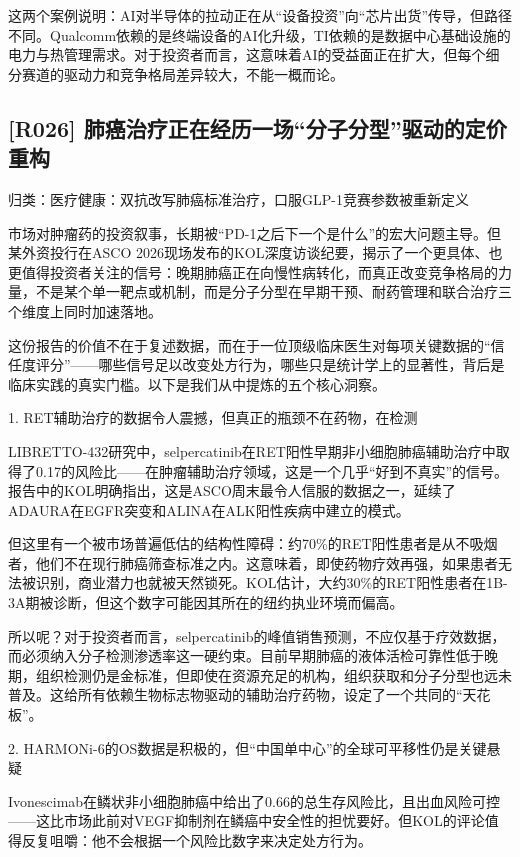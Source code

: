 \documentclass[11pt]{ctexart}
\begin{document}
这两个案例说明：AI对半导体的拉动正在从“设备投资”向“芯片出货”传导，但路径不同。Qualcomm依赖的是终端设备的AI化升级，TI依赖的是数据中心基础设施的电力与热管理需求。对于投资者而言，这意味着AI的受益面正在扩大，但每个细分赛道的驱动力和竞争格局差异较大，不能一概而论。

\subsection{[R026] 肺癌治疗正在经历一场“分子分型”驱动的定价重构}
{\small\color{refgray}归类：医疗健康：双抗改写肺癌标准治疗，口服GLP-1竞赛参数被重新定义}

市场对肿瘤药的投资叙事，长期被“PD-1之后下一个是什么”的宏大问题主导。但某外资投行在ASCO 2026现场发布的KOL深度访谈纪要，揭示了一个更具体、也更值得投资者关注的信号：晚期肺癌正在向慢性病转化，而真正改变竞争格局的力量，不是某个单一靶点或机制，而是分子分型在早期干预、耐药管理和联合治疗三个维度上同时加速落地。

这份报告的价值不在于复述数据，而在于一位顶级临床医生对每项关键数据的“信任度评分”——哪些信号足以改变处方行为，哪些只是统计学上的显著性，背后是临床实践的真实门槛。以下是我们从中提炼的五个核心洞察。

1. RET辅助治疗的数据令人震撼，但真正的瓶颈不在药物，在检测

LIBRETTO-432研究中，selpercatinib在RET阳性早期非小细胞肺癌辅助治疗中取得了0.17的风险比——在肿瘤辅助治疗领域，这是一个几乎“好到不真实”的信号。报告中的KOL明确指出，这是ASCO周末最令人信服的数据之一，延续了ADAURA在EGFR突变和ALINA在ALK阳性疾病中建立的模式。

但这里有一个被市场普遍低估的结构性障碍：约70\%的RET阳性患者是从不吸烟者，他们不在现行肺癌筛查标准之内。这意味着，即使药物疗效再强，如果患者无法被识别，商业潜力也就被天然锁死。KOL估计，大约30\%的RET阳性患者在1B-3A期被诊断，但这个数字可能因其所在的纽约执业环境而偏高。

所以呢？对于投资者而言，selpercatinib的峰值销售预测，不应仅基于疗效数据，而必须纳入分子检测渗透率这一硬约束。目前早期肺癌的液体活检可靠性低于晚期，组织检测仍是金标准，但即使在资源充足的机构，组织获取和分子分型也远未普及。这给所有依赖生物标志物驱动的辅助治疗药物，设定了一个共同的“天花板”。

2. HARMONi-6的OS数据是积极的，但“中国单中心”的全球可平移性仍是关键悬疑

Ivonescimab在鳞状非小细胞肺癌中给出了0.66的总生存风险比，且出血风险可控——这比市场此前对VEGF抑制剂在鳞癌中安全性的担忧要好。但KOL的评论值得反复咀嚼：他不会根据一个风险比数字来决定处方行为。
\end{document}
